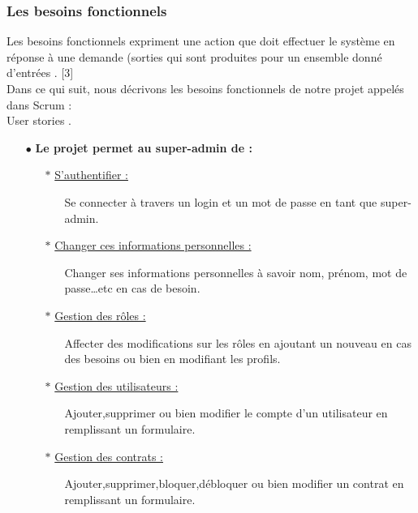 \documentclass{article}
\begin{document}
\subsubsection{Les besoins fonctionnels}
\guillemotleft Les besoins fonctionnels expriment une action que doit effectuer le système en réponse à une demande (sorties qui sont produites pour un ensemble donné d’entrées \guillemotright. [3] \\
Dans ce qui suit, nous décrivons les besoins fonctionnels de notre projet appelés dans Scrum : \\ \guillemotleft User stories \guillemotright.
\begin{enumerate}
\item [$\bullet$] \textbf{Le projet permet au super-admin de :} 
	\begin{enumerate}
	 \item [$\ast$] \uline{S’authentifier :}
	 	\begin{enumerate}
     		\item [\textendash]Se connecter à travers un login et un mot de passe en tant que super-admin.
		\end{enumerate}
	\item [$\ast$] \uline{Changer ces informations personnelles :}
		\begin{enumerate}
     		\item [\textendash]Changer ses informations personnelles à savoir nom, prénom, mot de passe…etc en cas de besoin.
		\end{enumerate}
	\item [$\ast$] \uline{Gestion des rôles :}
		\begin{enumerate}
     		\item [\textendash]Affecter des modifications sur les rôles en ajoutant un nouveau en cas des besoins ou bien en modifiant les profils.
		\end{enumerate}    
	\item [$\ast$] \uline{Gestion des utilisateurs :}
		\begin{enumerate}
     		\item [\textendash] Ajouter,supprimer ou bien modifier le compte d'un utilisateur en remplissant un formulaire. 
		\end{enumerate}	
	\item [$\ast$] \uline{Gestion des contrats :}
		\begin{enumerate}
     		\item [\textendash] Ajouter,supprimer,bloquer,débloquer ou bien modifier un contrat en remplissant un formulaire. 

\end{enumerate}
\end{enumerate}
\end{enumerate}
\end{document}
